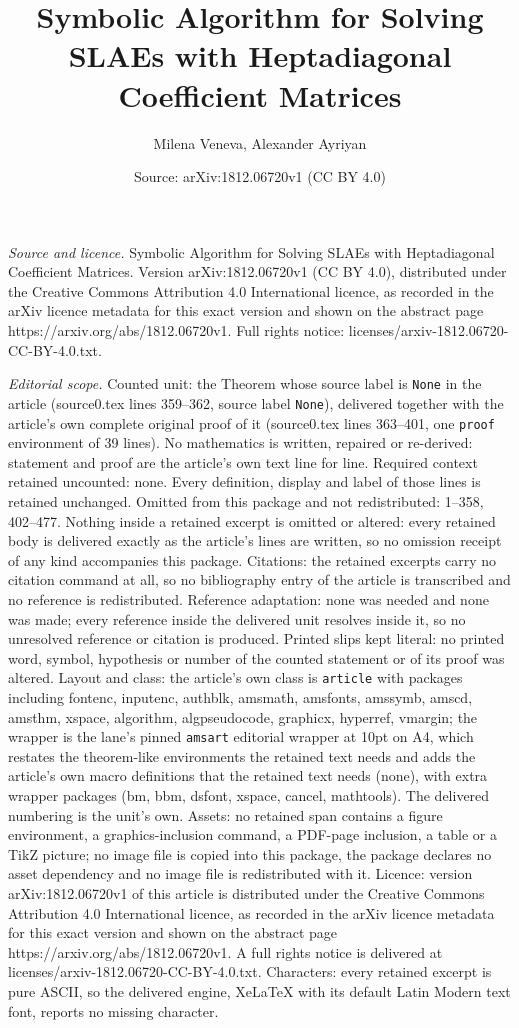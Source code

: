 \documentclass[10pt,a4paper]{amsart}
\title[Symbolic Algorithm for Solving SLAEs with Heptadiagonal Coef]{Symbolic Algorithm for Solving SLAEs with Heptadiagonal Coefficient Matrices}
\author{Milena Veneva, Alexander Ayriyan}
\date{Source: arXiv:1812.06720v1 (CC BY 4.0)}
\begin{document}
\maketitle

\noindent\emph{Source and licence.} Symbolic Algorithm for Solving SLAEs with Heptadiagonal Coefficient Matrices. Version arXiv:1812.06720v1 (CC BY 4.0), distributed under the Creative Commons Attribution 4.0 International licence, as recorded in the arXiv licence metadata for this exact version and shown on the abstract page https://arxiv.org/abs/1812.06720v1. Full rights notice: licenses/arxiv-1812.06720-CC-BY-4.0.txt.\par\smallskip

\noindent\textit{Editorial scope.} Counted unit: the Theorem whose source label is \texttt{None} in the article (source0.tex lines 359--362, source label \texttt{None}), delivered together with the article's own complete original proof of it (source0.tex lines 363--401, one \texttt{proof} environment of 39 lines). No mathematics is written, repaired or re-derived: statement and proof are the article's own text line for line. Required context retained uncounted: none. Every definition, display and label of those lines is retained unchanged. Omitted from this package and not redistributed: 1--358, 402--477. Nothing inside a retained excerpt is omitted or altered: every retained body is delivered exactly as the article's lines are written, so no omission receipt of any kind accompanies this package. Citations: the retained excerpts carry no citation command at all, so no bibliography entry of the article is transcribed and no reference is redistributed. Reference adaptation: none was needed and none was made; every reference inside the delivered unit resolves inside it, so no unresolved reference or citation is produced. Printed slips kept literal: no printed word, symbol, hypothesis or number of the counted statement or of its proof was altered. Layout and class: the article's own class is \texttt{article} with packages including fontenc, inputenc, authblk, amsmath, amsfonts, amssymb, amscd, amsthm, xspace, algorithm, algpseudocode, graphicx, hyperref, vmargin; the wrapper is the lane's pinned \texttt{amsart} editorial wrapper at 10pt on A4, which restates the theorem-like environments the retained text needs and adds the article's own macro definitions that the retained text needs (none), with extra wrapper packages (bm, bbm, dsfont, xspace, cancel, mathtools). The delivered numbering is the unit's own. Assets: no retained span contains a figure environment, a graphics-inclusion command, a PDF-page inclusion, a table or a TikZ picture; no image file is copied into this package, the package declares no asset dependency and no image file is redistributed with it. Licence: version arXiv:1812.06720v1 of this article is distributed under the Creative Commons Attribution 4.0 International licence, as recorded in the arXiv licence metadata for this exact version and shown on the abstract page https://arxiv.org/abs/1812.06720v1. A full rights notice is delivered at licenses/arxiv-1812.06720-CC-BY-4.0.txt. Characters: every retained excerpt is pure ASCII, so the delivered engine, XeLaTeX with its default Latin Modern text font, reports no missing character.
\end{document}
